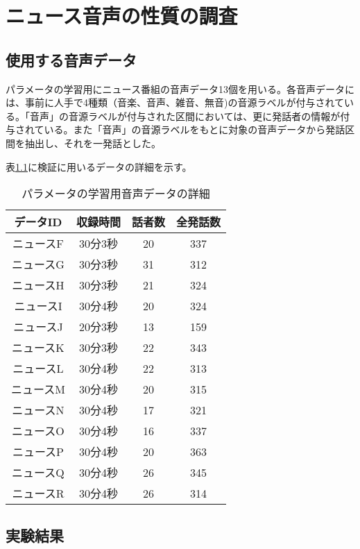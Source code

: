 \chapter{ニュース音声の性質の調査}

\section{使用する音声データ}
パラメータの学習用にニュース番組の音声データ13個を用いる。各音声データには、事前に人手で4種類（音楽、音声、雑音、無音)の音源ラベルが付与されている。「音声」の音源ラベルが付与された区間においては、更に発話者の情報が付与されている。また「音声」の音源ラベルをもとに対象の音声データから発話区間を抽出し、それを一発話とした。\par
表\ref{table:train_detail}に検証に用いるデータの詳細を示す。\vspace{0.2in}

\begin{table}[htb]
  \begin{center}
  \label{table:train_detail}
    \caption{パラメータの学習用音声データの詳細}
    \begin{tabular}{|c||c|c|c|} \hline
      データID & 収録時間 & 話者数 & 全発話数 \\ \hline
      ニュースF & 30分3秒 & 20 & 337 \\ \hline
      ニュースG & 30分3秒 & 31 & 312\\ \hline
      ニュースH & 30分3秒 & 21 & 324 \\ \hline
      ニュースI & 30分4秒 & 20 & 324\\ \hline
      ニュースJ & 20分3秒 & 13 & 159\\ \hline
      ニュースK & 30分3秒 & 22 & 343\\ \hline
      ニュースL & 30分4秒 & 22 & 313\\ \hline
      ニュースM & 30分4秒 & 20 & 315\\ \hline
      ニュースN & 30分4秒 & 17 & 321\\ \hline
      ニュースO & 30分4秒 & 16 & 337\\ \hline
      ニュースP & 30分4秒 & 20 & 363\\ \hline
      ニュースQ & 30分4秒 & 26 & 345\\ \hline
      ニュースR & 30分4秒 & 26 & 314\\ \hline
    \end{tabular}
  \end{center}
\end{table}
\section{実験結果}